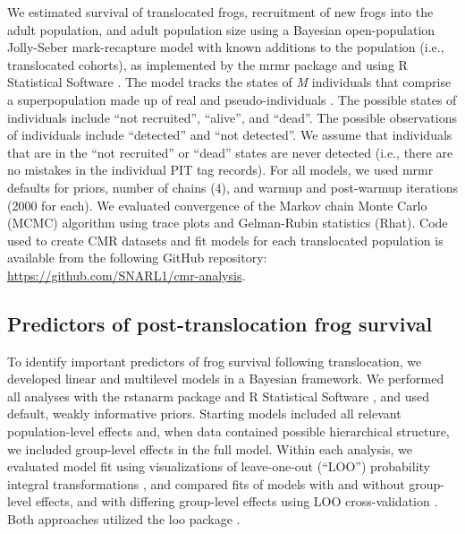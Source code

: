 \documentclass[9pt,twocolumn,twoside,lineno]{pnas-new}
\begin{document}
{We estimated survival of translocated frogs, recruitment of new frogs
into the adult population, and adult population size using a Bayesian
open-population Jolly-Seber mark-recapture model with known additions to
the population (i.e., translocated cohorts), as implemented by the mrmr
package \citep{joseph2019} and using R Statistical Software
\citep[v4.4.4,][]{rsoftware2022}. The model tracks the states of
\emph{M} individuals that comprise a superpopulation made up of real and
pseudo-individuals \citep[see][ for details]{joseph2018}. The possible
states of individuals include ``not recruited'', ``alive'', and
``dead''. The possible observations of individuals include ``detected''
and ``not detected''. We assume that individuals that are in the ``not
recruited'' or ``dead'' states are never detected (i.e., there are no
mistakes in the individual PIT tag records). For all models, we used
mrmr defaults for priors, number of chains (4), and warmup and
post-warmup iterations (2000 for each). We evaluated convergence of the
Markov chain Monte Carlo (MCMC) algorithm using trace plots and
Gelman-Rubin statistics (Rhat). Code used to create CMR datasets and fit
models for each translocated population is available from the following
GitHub repository: \url{https://github.com/SNARL1/cmr-analysis}.

\hypertarget{predictors-of-post-translocation-frog-survival}{%
\subsection*{Predictors of post-translocation frog
survival}\label{predictors-of-post-translocation-frog-survival}}

To identify important predictors of frog survival following
translocation, we developed linear and multilevel models in a Bayesian
framework. We performed all analyses with the rstanarm package
\citep{rstanarm2022} and R Statistical Software
\citep[v4.4.4,][]{rsoftware2022}, and used default, weakly informative
priors. Starting models included all relevant population-level effects
and, when data contained possible hierarchical structure, we included
group-level effects in the full model. Within each analysis, we
evaluated model fit using visualizations of leave-one-out (``LOO'')
probability integral transformations \citep{gelman2013, gabry2019}, and
compared fits of models with and without group-level effects, and with
differing group-level effects using LOO cross-validation
\citep{vehtari2016}. Both approaches utilized the loo package
\citep{vehtari2022}.

}
\end{document}
